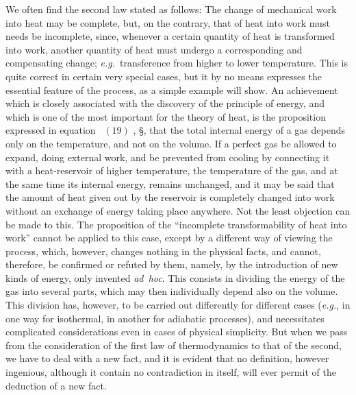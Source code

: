 \documentclass[12pt]{book}[2005/09/16]
\newcommand{\SecRef}[2][§\;]{\hyperref[section:#2.]{{\upshape #1#2}}}
\newcommand{\Eq}[1]{%
  \hyperref[eqn:#1]{\ensuremath{#1}}%
}
\newcommand{\PageSep}[1]{\ignorespaces}
\newcommand{\eg}{\emph{e.g.}}
\begin{document}
We often find the second law stated as follows: The
change of mechanical work into heat may be complete, but,
on the contrary, that of heat into work must needs be
incomplete, since, whenever a certain quantity of heat is
transformed into work, another quantity of heat must
undergo a corresponding and compensating change; \eg\
transference from higher to lower temperature. This is
quite correct in certain very special cases, but it by no
means expresses the essential feature of the process, as a
simple example will show. An achievement which is
closely associated with the discovery of the principle of
energy, and which is one of the most important for the
theory of heat, is the proposition expressed in equation~\Eq{(19)},
\SecRef{70}, that the total internal energy of a gas depends only
on the temperature, and not on the volume. If a perfect
gas be allowed to expand, doing external work, and be prevented
from cooling by connecting it with a heat-reservoir
of higher temperature, the temperature of the gas, and at
the same time its internal energy, remains unchanged, and
it may be said that the amount of heat given out by the
reservoir is completely changed into work without an exchange
of energy taking place anywhere. Not the least
objection can be made to this. The proposition of the
``incomplete transformability of heat into work'' cannot
%
be applied to this case, except by a different way of viewing
the process, which, however, changes nothing in the physical
facts, and cannot, therefore, be confirmed or refuted by
them, namely, by the introduction of new kinds of energy,
only invented \textit{ad~hoc}. This consists in dividing the
energy of the gas into several parts, which may then
individually depend also on the volume. This division has,
however, to be carried out differently for different cases (\eg,
in one way for isothermal, in another for adiabatic processes),
and necessitates complicated considerations even in
cases of physical simplicity. But when we pass from the
\PageSep{81}
consideration of the first law of thermodynamics to that of
the second, we have to deal with a new fact, and it is evident
that no definition, however ingenious, although it contain
no contradiction in itself, will ever permit of the deduction
of a new fact.
\end{document}
